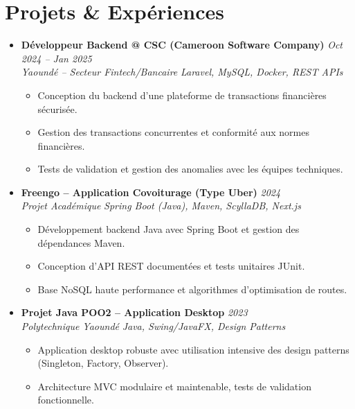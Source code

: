 \documentclass[a4paper,11pt]{article}
\begin{document}
\section{Projets \& Expériences}
\begin{itemize}[leftmargin=*, label={-}]

\item \textbf{Développeur Backend @ CSC (Cameroon Software Company)} \hfill \textit{Oct 2024 -- Jan 2025} \\
\textit{Yaoundé -- Secteur Fintech/Bancaire} \hfill \textit{Laravel, MySQL, Docker, REST APIs}
\vspace{-2pt}
    \begin{itemize}[leftmargin=0.4cm, nosep, label=\tiny$\bullet$]
        \item \small{Conception du backend d'une plateforme de transactions financières sécurisée.}
        \item \small{Gestion des transactions concurrentes et conformité aux normes financières.}
        \item \small{Tests de validation et gestion des anomalies avec les équipes techniques.}
    \end{itemize}
\vspace{3pt}

\item \textbf{Freengo -- Application Covoiturage (Type Uber)} \hfill \textit{2024} \\
\textit{Projet Académique} \hfill \textit{Spring Boot (Java), Maven, ScyllaDB, Next.js}
\vspace{-2pt}
    \begin{itemize}[leftmargin=0.4cm, nosep, label=\tiny$\bullet$]
        \item \small{Développement backend Java avec Spring Boot et gestion des dépendances Maven.}
        \item \small{Conception d'API REST documentées et tests unitaires JUnit.}
        \item \small{Base NoSQL haute performance et algorithmes d'optimisation de routes.}
    \end{itemize}
\vspace{3pt}

\item \textbf{Projet Java POO2 -- Application Desktop} \hfill \textit{2023} \\
\textit{Polytechnique Yaoundé} \hfill \textit{Java, Swing/JavaFX, Design Patterns}
\vspace{-2pt}
    \begin{itemize}[leftmargin=0.4cm, nosep, label=\tiny$\bullet$]
        \item \small{Application desktop robuste avec utilisation intensive des design patterns (Singleton, Factory, Observer).}
        \item \small{Architecture MVC modulaire et maintenable, tests de validation fonctionnelle.}
    \end{itemize}
\vspace{3pt}


\end{itemize}
\end{document}
